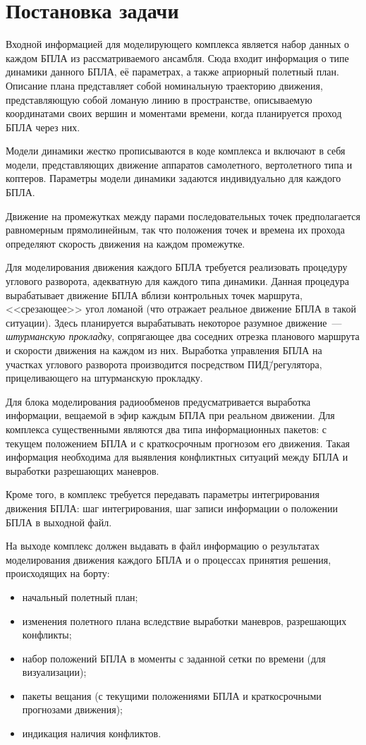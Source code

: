 \documentclass[a4paper,12pt]{article}
\begin{document}
\section{Постановка задачи}

Входной информацией для моделирующего комплекса является набор данных о каждом БПЛА из рассматриваемого ансамбля. Сюда входит информация о типе динамики данного БПЛА, её параметрах, а также априорный полетный план. Описание плана представляет собой номинальную траекторию движения, представляющую собой ломаную линию в пространстве, описываемую координатами своих вершин и моментами времени, когда планируется проход БПЛА через них.

Модели динамики жестко прописываются в коде комплекса и включают в себя модели, представляющих движение аппаратов самолетного, вертолетного типа и коптеров. Параметры модели динамики задаются индивидуально для каждого БПЛА.

Движение на промежутках между парами последовательных точек предполагается равномерным прямолинейным, так что положения точек и времена их прохода определяют скорость движения на каждом промежутке. 

Для моделирования движения каждого БПЛА требуется реализовать процедуру углового разворота, адекватную для каждого типа динамики. Данная процедура вырабатывает движение БПЛА вблизи контрольных точек маршрута, <<срезающее>> угол ломаной (что отражает реальное движение БПЛА в такой ситуации). Здесь планируется вырабатывать некоторое разумное движение~--- \textit{штурманскую прокладку}, сопрягающее два соседних отрезка планового маршрута и скорости движения на каждом из них. Выработка управления БПЛА на участках углового разворота производится посредством ПИД\=/регулятора, прицеливающего на штурманскую прокладку.

Для блока моделирования радиообменов предусматривается выработка информации, вещаемой в эфир каждым БПЛА при реальном движении. Для комплекса существенными являются два типа информационных пакетов: с текущем положением БПЛА и с краткосрочным прогнозом его движения. Такая информация необходима для выявления конфликтных ситуаций между БПЛА и выработки разрешающих маневров.

Кроме того, в комплекс требуется передавать параметры интегрирования движения БПЛА: шаг интегрирования, шаг записи информации о положении БПЛА в выходной файл.

На выходе комплекс должен выдавать в файл информацию о результатах моделирования движения каждого БПЛА и о процессах принятия решения, происходящих на борту:
\begin{itemize}
  \item начальный полетный план;
  \item изменения полетного плана вследствие выработки маневров, разрешающих конфликты;
  \item набор положений БПЛА в моменты с заданной сетки по времени (для визуализации);
  \item пакеты вещания (с текущими положениями БПЛА и краткосрочными прогнозами движения);
  \item индикация наличия конфликтов.
\end{itemize}
\end{document}
